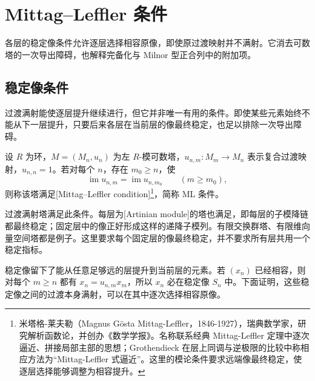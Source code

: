 
\section{Mittag–Leffler 条件}
\label{b4:sec:1304}

各层的稳定像条件允许逐层选择相容原像，即使原过渡映射并不满射。它消去可数塔的一次导出障碍，也解释完备化与 Milnor 型正合列中的附加项。

%
%
%

\subsection{稳定像条件}
\label{b4:subsec:1304:01}

过渡满射能使逐层提升继续进行，但它并非唯一有用的条件。即使某些元素始终不能从下一层提升，只要后来各层在当前层的像最终稳定，也足以排除一次导出障碍。

\begin{definition}\label{b4:def:mittag-leffler-tower}
	设 \(R\) 为环，\(M=(M_n,u_n)\) 为左 \(R\)-模可数塔，\(u_{n,m}:M_m\to M_n\) 表示复合过渡映射，\(u_{n,n}=1\)。若对每个 \(n\)，存在 \(m_0\ge n\)，使
	\[
		\operatorname{im}u_{n,m}=\operatorname{im}u_{n,m_0} \qquad(m\ge m_0),
	\]
	则称该塔满足[Mittag--Leffler condition]\footnote{米塔格-莱夫勒（Magnus Gösta Mittag-Leffler，1846-1927），瑞典数学家，研究解析函数论，并创办《数学学报》。名称联系经典 Mittag-Leffler 定理中逐次逼近、拼接局部主部的思想；Grothendieck 在层上同调与逆极限的比较中称相应方法为“Mittag-Leffler 式逼近”。这里的模论条件要求远端像最终稳定，使逐层选择能够调整为相容提升。}，简称 ML 条件。
\end{definition}

过渡满射塔满足此条件。每层为[Artinian module]的塔也满足，即每层的子模降链都最终稳定；固定层中的像正好形成这样的递降子模列。有限交换群塔、有限维向量空间塔都是例子。这里要求每个固定层的像最终稳定，并不要求所有层共用一个稳定指标。

\ProseParagraphBreak
稳定像留下了能从任意足够远的层提升到当前层的元素。若 \((x_n)\) 已经相容，则对每个 \(m\ge n\) 都有 \(x_n=u_{n,m}x_m\)，所以 \(x_n\) 必在稳定像 \(S_n\) 中。下面证明，这些稳定像之间的过渡本身满射，可以在其中逐次选择相容原像。

